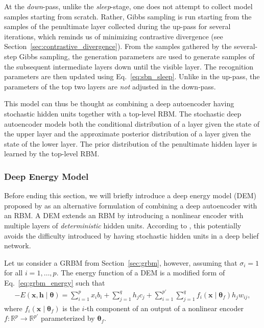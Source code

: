 \documentclass[dissertation,nocontribution,draft*]{aaltoseries}
\newcommand{\vect}[1]{\mathbf{#1}}
\newcommand{\vects}[1]{\boldsymbol{#1}}
\newcommand{\vh}[0]{\vect{h}}
\newcommand{\vx}[0]{\vect{x}}
\newcommand{\TT}[0]{{\vects{\theta}}}
\newcommand{\RR}[0]{\mathbb{R}}
\begin{document}
At the \textit{down}-pass, unlike the \textit{sleep}-stage,
one does not attempt to collect model samples starting from
scratch. Rather, Gibbs sampling is run starting from the
samples of the penultimate layer collected during the
up-pass for several iterations, which reminds us of
minimizing contrastive divergence (see
Section~\ref{sec:contrastive_divergence}). From the samples
gathered by the several-step Gibbs sampling, the generation
parameters are used to generate samples of the subsequent
intermediate layers down until the visible layer. The
recognition parameters are then updated using
Eq.~\eqref{eq:sbn_sleep}. Unlike in the up-pass, the
parameters of the top two layers are \textit{not} adjusted
in the down-pass.

This model can thus be thought as combining a deep
autoencoder having stochastic hidden units together with a
top-level RBM. The stochastic deep autoencoder models both
the conditional distribution of a layer given the state of
the upper layer and the approximate posterior distribution
of a layer given the state of the lower layer. The prior
distribution of the penultimate hidden layer is learned by
the top-level RBM.

\subsubsection{Deep Energy Model}

Before ending this section, we will briefly introduce a deep
energy model (DEM) proposed by \citet{Ngiam2011} as an
alternative formulation of combining a deep autoencoder with
an RBM. A DEM extends an RBM by introducing a nonlinear
encoder with multiple layers of \textit{deterministic}
hidden units. According to \citet{Ngiam2011}, this potentially
avoids the difficulty introduced by having stochastic hidden
units in a deep belief network.

Let us consider a GRBM from Section~\ref{sec:grbm}, however,
assuming that $\sigma_i=1$ for all $i=1,\dots,p$. The energy
function of a DEM is a modified form of
Eq.~\eqref{eq:grbm_energy} such that
\begin{align*}
    \label{eq:dem_energy}
    -E(\vx, \vh \mid \TT) = \sum_{i=1}^p x_i b_i
    + \sum_{j=1}^q h_j c_j +
    \sum_{i=1}^{p'} \sum_{j=1}^q f_i(\vx\mid \TT_f) h_j
    w_{ij},
\end{align*}
where $f_i(\vx \mid \TT_f)$ is the $i$-th component of an
output of a nonlinear encoder $f:\RR^p \to \RR^{p'}$
parameterized by $\TT_f$.
\end{document}
